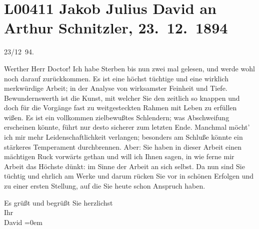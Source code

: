 

\section[Jakob Julius David an Arthur Schnitzler, 23. 12. 1894]{L00411 Jakob Julius David an Arthur Schnitzler, 23. 12. 1894}
\nopagebreak{}
\rehead{ }\normalsize\beginnumbering{}
\toendnotes[C]{\smallbreak\pagebreak[2]}
\toendnotes[C]{\smallbreak}
\pstart
           \raggedleft{}{\pb}23/12 94.\pend
           
\pstart\center{}Werther Herr Doctor!\pend\vspace{0.5em}
\pstart
           Ich habe Sterben bis nun zwei mal gelesen, und
               werde wohl noch darauf zurückkommen. Es ist eine höchst tüchtige und eine wirklich
               merkwürdige Arbeit; in der Analyse von wirksamster Feinheit und Tiefe.
               Bewundernswerth ist die Kunst, mit welcher Sie den zeitlich so knappen und doch für
               die Vorgänge fast zu weitgesteckten Rahmen mit Leben zu erfüllen wißen. Es ist ein
               vollkommen zielbewußtes Schlendern; was Abschweifung erscheinen könnte, führt nur
               desto sicherer zum letzten Ende. Manchmal möcht’ ich mir mehr Leidenschaftlichkeit
               verlangen; besonders am Schluße könnte ein stärkeres Temperament durchbrennen. Aber:
               Sie haben in dieser Arbeit
               einen mächtigen Ruck vorwärts gethan und will ich Ihnen sagen, in wie ferne mir
               Arbeit das Höchste dünkt: im Sinne der Arbeit an sich selbst. Da nun sind Sie tüchtig
               und ehrlich am Werke und darum rücken Sie vor in schönen Erfolgen und zu einer ersten
               Stellung, auf die Sie heute schon Anspruch haben.\pend
           
\pstart
           Es grüßt und begrüßt Sie herzlichst{\\[\baselineskip]}Ihr{\\[\baselineskip]}\spacefill\mbox{David}\pend
           \leftskip=0em{}\endnumbering{}  
      